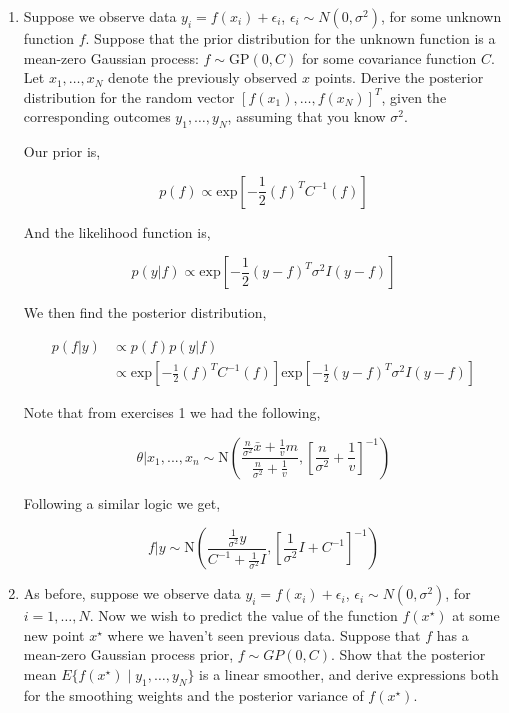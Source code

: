 \documentclass[10pt]{article}
\begin{document}
        \begin{enumerate}[label=(\Alph*)]
            \item Suppose we observe data $y_i = f(x_i) + \epsilon_i$, $\epsilon_i \sim N(0, \sigma^2)$, for some unknown function $f$. Suppose that the prior distribution for the unknown function is a mean-zero Gaussian process: $f \sim \mbox{GP}(0, C)$ for some covariance function $C$.  Let $x_1, \ldots, x_N$ denote the previously observed $x$ points.  Derive the posterior distribution for the random vector $[f(x_1), \ldots, f(x_N)]^T$, given the corresponding outcomes $y_1, \ldots, y_N$, assuming that you know $\sigma^2$.

            Our prior is,

            $$p(f) \propto \text{exp}\left[ -\frac{1}{2}(f)^T C^{-1} (f)\right]$$

            And the likelihood function is,

            $$p(y|f) \propto \text{exp}\left[ -\frac{1}{2}(y - f)^T \sigma^2 I (y-f)\right]$$

            We then find the posterior distribution,

            \begin{align*}
            p(f|y) &\propto p(f) p(y|f) \\
                &\propto \text{exp}\left[ -\frac{1}{2}(f)^T C^{-1} (f)\right] \text{exp}\left[ -\frac{1}{2}(y - f)^T \sigma^2 I (y-f)\right] 
            \end{align*}

            Note that from exercises 1 we had the following,

            $$\theta | x_1,...,x_n \sim \text{N} \left( \frac{\frac{n}{\sigma^2} \bar{x} + \frac{1}{v}m}{\frac{n}{\sigma^2} + \frac{1}{v}}, \left [ \frac{n}{\sigma^2} + \frac{1}{v}\right]^{-1} \right)$$

            Following a similar logic we get,

            $$f|y \sim \text{N} \left( \frac{\frac{1}{\sigma^2}y}{C^{-1} + \frac{1}{\sigma^2}I}, \left[ \frac{1}{\sigma^2}I + C^{-1}\right]^{-1}\right)$$

            \item As before, suppose we observe data $y_i = f(x_i) + \epsilon_i$, $\epsilon_i \sim N(0, \sigma^2)$, for $i=1, \ldots, N$.  Now we wish to predict the value of the function $f(x^{\star})$ at some new point $x^{\star}$ where we haven't seen previous data.  Suppose that $f$ has a mean-zero Gaussian process prior, $f \sim GP(0, C)$.  Show that the posterior mean $E\{ f(x^{\star}) \mid y_1, \ldots, y_N \}$ is a linear smoother, and derive expressions both for the smoothing weights and the posterior variance of $f(x^{\star})$.


\end{enumerate}
\end{document}
